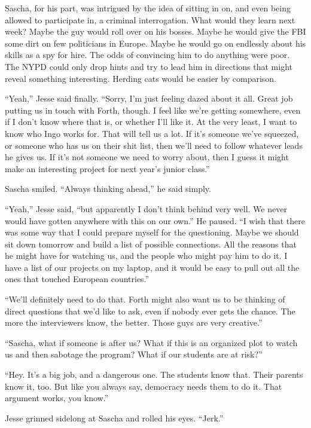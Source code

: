 \documentclass[12pt]{book}
\begin{document}
Sascha, for his part, was intrigued by the idea of sitting in on, and even being allowed to participate in, a criminal interrogation.  What would they learn next week?  Maybe the guy would roll over on his bosses.  Maybe he would give the FBI some dirt on few politicians in Europe.  Maybe he would go on endlessly about his skills as a spy for hire.  The odds of convincing him to do anything were poor.  The NYPD could only drop hints and try to lead him in directions that might reveal something interesting.  Herding cats would be easier by comparison.

``Yeah,'' Jesse said finally.  ``Sorry, I'm just feeling dazed about it all.  Great job putting us in touch with Forth, though.  I feel like we're getting somewhere, even if I don't know where that is, or whether I'll like it.  At the very least, I want to know who Ingo works for.  That will tell us a lot.  If it's someone we've squeezed, or someone who has us on their shit list, then we'll need to follow whatever leads he gives us.  If it's not someone we need to worry about, then I guess it might make an interesting project for next year's junior class.''

Sascha smiled.  ``Always thinking ahead,'' he said simply.

``Yeah,'' Jesse said, ``but apparently I don't think behind very well.  We never would have gotten anywhere with this on our own.''  He paused.  ``I wish that there was some way that I could prepare myself for the questioning.  Maybe we should sit down tomorrow and build a list of possible connections.  All the reasons that he might have for watching us, and the people who might pay him to do it.  I have a list of our projects on my laptop, and it would be easy to pull out all the ones that touched European countries.''

``We'll definitely need to do that.  Forth might also want us to be thinking of direct questions that we'd like to ask, even if nobody ever gets the chance.  The more the interviewers know, the better.  Those guys are very creative.''

``Sascha, what if someone is after us?  What if this is an organized plot to watch us and then sabotage the program?  What if our students are at risk?''

``Hey.  It's a big job, and a dangerous one.  The students know that.  Their parents know it, too.  But like you always say, democracy needs them to do it.  That argument works, you know.''

Jesse grinned sidelong at Sascha and rolled his eyes.  ``Jerk.''
\end{document}
